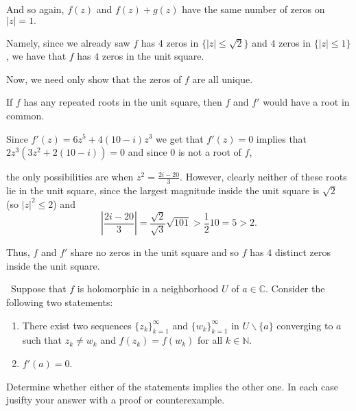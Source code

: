 \documentclass[12pt]{Qual}
\begin{document}
\begin{solution}
And so again, $f(z)$ and $f(z)+g(z)$ have the same number of zeros on $|z|=1.$

Namely, since we already saw $f$ has $4$ zeros in $\{|z|\le\sqrt{2}\}$ and $4$ zeros in $\{|z|\le 1\}$, we have that $f$ has $4$ zeros in the unit square.

Now, we need only show that the zeros of $f$ are all unique.

If $f$ has any repeated roots in the unit square, then $f$ and $f'$ would have a root in common.

Since $f'(z)=6z^5+4(10-i)z^3$ we get that $f'(z)=0$ implies that $2z^3(3z^2+2(10-i))=0$ and since $0$ is not a root of $f$,

the only possibilities are when $z^2=\frac{2i-20}{3}$. However, clearly neither of these roots lie in the unit square, since the largest magnitude inside the unit square is $\sqrt{2}$ (so $|z|^2\le 2$) and $$|\frac{2i-20}{3}|=\frac{\sqrt{2}}{\sqrt{3}}\sqrt{101}>\frac{1}{2}10=5>2.$$

Thus, $f$ and $f'$ share no zeros in the unit square and so $f$ has $4$ distinct zeros inside the unit square.
\end{solution}
\newpage




\begin{problem} $\,$
Suppose that $f$ is holomorphic in a neighborhood $U$ of $a\in\mathbb{C}$. Consider the following two statements:
\begin{enumerate}[label=(\roman*)]
    \item There exist two sequences $\{z_k\}_{k=1}^\infty$ and $\{w_k\}_{k=1}^\infty$ in $U\backslash\{a\}$ converging to $a$ such that $z_k\not=w_k$ and $f(z_k)=f(w_k)$ for all $k\in\mathbb{N}$.
    \item $f'(a)=0$.
\end{enumerate}
Determine whether either of the statements implies the other one. In each case jusifty your answer with a proof or counterexample.
\end{problem}
\end{document}
